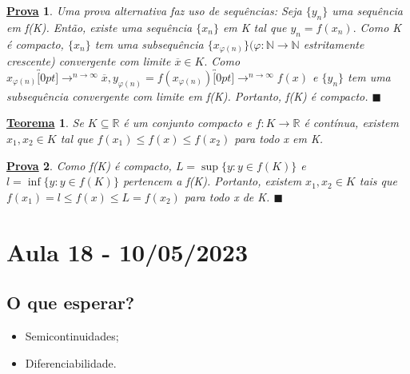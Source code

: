 \documentclass{article}
\newtheorem*{theorem*}{\underline{Teorema}}
\newtheorem*{proof*}{\underline{Prova}}
\renewcommand\qedsymbol{$\blacksquare$}
\begin{document}
\begin{proof*}
  Uma prova alternativa faz uso de sequências: Seja $\{y_{n}\}$ uma sequência em f(K). Então, existe uma sequência
  $\{x_{n}\}$ em K tal que $y_{n}=f(x_{n}).$ Como K é compacto, $\{x_{n}\}$ tem uma subsequência $\{x_{\varphi (n)}\}(\varphi :\mathbb{N}\rightarrow \mathbb{N}$
  estritamente crescente) convergente com limite $\overline{x}\in K.$ Como $x_{\varphi (n)}\overbracket[0pt]{\longrightarrow}^{n\to \infty}\overline{x},
  y_{\varphi (n)}=f(x_{\varphi (n)})\overbracket[0pt]{\longrightarrow}^{n\to \infty}f(x)$ e $\{y_{n}\}$ tem uma
  subsequência convergente com limite em f(K). Portanto, f(K) é compacto. \qedsymbol
\end{proof*} 
\begin{theorem*}
  Se $K\subseteq{\mathbb{R}}$ é um conjunto compacto e $f:K\rightarrow \mathbb{R}$ é contínua, existem $x_{1},x_{2}\in K$ tal que
  $f(x_{1})\leq f(x)\leq f(x_{2})$ para todo x em K.
\end{theorem*}
\begin{proof*}
  Como f(K) é compacto, $L=\sup{\{y:y\in f(K)\}}$ e $l=\inf{\{y:y\in f(K)\}}$ pertencem a f(K). Portanto, existem $x_{1},x_{2}\in K$
  tais que $f(x_{1})=l\leq f(x)\leq L = f(x_{2})$ para todo x de K. \qedsymbol
\end{proof*}

\section{Aula 18 - 10/05/2023}
\subsection{O que esperar?}
\begin{itemize}
  \item Semicontinuidades;
  \item Diferenciabilidade.
\end{itemize}
\end{document}
